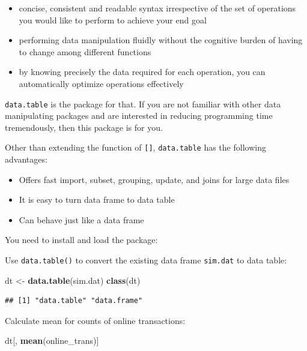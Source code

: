 \documentclass[12pt,]{krantz}
\makeatletter
\newenvironment{Shaded}{\begin{snugshade}}{\end{snugshade}}
\newcommand{\KeywordTok}[1]{\textcolor[rgb]{0.27,0.27,0.27}{\textbf{#1}}}
\newcommand{\NormalTok}[1]{#1}
\newcommand{\StringTok}[1]{\textcolor[rgb]{0.5,0.5,0.5}{#1}}
\providecommand{\tightlist}{%
  \setlength{\itemsep}{0pt}\setlength{\parskip}{0pt}}
\newenvironment{kframe}{%
\medskip{}
\setlength{\fboxsep}{.8em}
 \def\at@end@of@kframe{}%
 \ifinner\ifhmode%
  \def\at@end@of@kframe{\end{minipage}}%
  \begin{minipage}{\columnwidth}%
 \fi\fi%
 \def\FrameCommand##1{\hskip\@totalleftmargin \hskip-\fboxsep
 \colorbox{shadecolor}{##1}\hskip-\fboxsep
     \hskip-\linewidth \hskip-\@totalleftmargin \hskip\columnwidth}%
 \MakeFramed {\advance\hsize-\width
   \@totalleftmargin\z@ \linewidth\hsize
   \@setminipage}}%
 {\par\unskip\endMakeFramed%
 \at@end@of@kframe}
\renewenvironment{Shaded}{\begin{kframe}}{\end{kframe}}
\makeatother
\begin{document}
\begin{itemize}
\tightlist
\item
  concise, consistent and readable syntax irrespective of the set of operations you would like to perform to achieve your end goal
\item
  performing data manipulation fluidly without the cognitive burden of having to change among different functions
\item
  by knowing precisely the data required for each operation, you can automatically optimize operations effectively
\end{itemize}

\texttt{data.table} is the package for that. If you are not familiar with other data manipulating packages and are interested in reducing programming time tremendously, then this package is for you.

Other than extending the function of \texttt{{[}{]}}, \texttt{data.table} has the following advantages:

\begin{itemize}
\tightlist
\item
  Offers fast import, subset, grouping, update, and joins for large data files
\item
  It is easy to turn data frame to data table
\item
  Can behave just like a data frame
\end{itemize}

You need to install and load the package:

Use \texttt{data.table()} to convert the existing data frame \texttt{sim.dat} to data table:

\begin{Shaded}
\begin{Highlighting}[]
\NormalTok{dt <-}\StringTok{ }\KeywordTok{data.table}\NormalTok{(sim.dat)}
\KeywordTok{class}\NormalTok{(dt)}
\end{Highlighting}
\end{Shaded}

\begin{verbatim}
## [1] "data.table" "data.frame"
\end{verbatim}

Calculate mean for counts of online transactions:

\begin{Shaded}
\begin{Highlighting}[]
\NormalTok{dt[, }\KeywordTok{mean}\NormalTok{(online_trans)]}
\end{Highlighting}
\end{Shaded}
\end{document}
